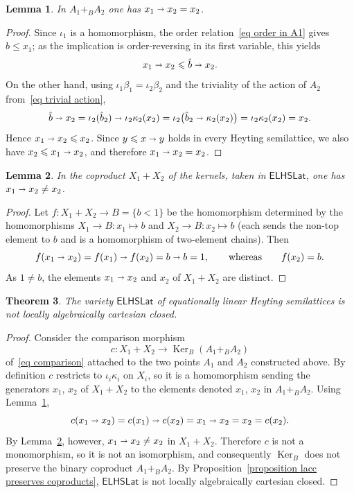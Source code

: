 \documentclass[reqno,a4paper]{amsart}
\newtheorem{lemma}{Lemma}[section]
\newtheorem{theorem}[lemma]{Theorem}
\theoremstyle{remark}
\theoremstyle{definition}
\newcommand{\iimplies}{\shortrightarrow}
\DeclareMathOperator{\Ker}{Ker}
\newcommand{\ELHSLat}{\ensuremath{\mathsf{ELHSLat}}}
\renewcommand{\leq}{\leqslant}
\begin{document}
\begin{lemma}\label{lemma lacc collapse}
	In \(A_1 +_B A_2\) one has \(x_1 \iimplies x_2 = x_2\).
\end{lemma}
\begin{proof}
	Since \(\iota_1\) is a homomorphism, the order relation~\eqref{eq order in A1} gives \(\hat b \leq x_1\); as the implication is order-reversing in its first variable, this yields
	\[
		x_1 \iimplies x_2 \leq \hat b \iimplies x_2.
	\]
	On the other hand, using \(\iota_1\beta_1 = \iota_2\beta_2\) and the triviality of the action of \(A_2\) from~\eqref{eq trivial action},
	\[
		\hat b \iimplies x_2 = \iota_2(\hat b_2) \iimplies \iota_2\kappa_2(x_2) = \iota_2\bigl(\hat b_2 \iimplies \kappa_2(x_2)\bigr) = \iota_2\kappa_2(x_2) = x_2.
	\]
	Hence \(x_1 \iimplies x_2 \leq x_2\). Since \(y \leq x \iimplies y\) holds in every Heyting semilattice, we also have \(x_2 \leq x_1 \iimplies x_2\), and therefore \(x_1 \iimplies x_2 = x_2\).
\end{proof}

\begin{lemma}\label{lemma lacc free}
	In the coproduct \(X_1 + X_2\) of the kernels, taken in \(\ELHSLat\), one has \(x_1 \iimplies x_2 \neq x_2\).
\end{lemma}
\begin{proof}
	Let \(f \colon X_1 + X_2 \to B = \{b < 1\}\) be the homomorphism determined by the homomorphisms \(X_1 \to B\colon x_1 \mapsto b\) and \(X_2 \to B\colon x_2 \mapsto b\) (each sends the non-top element to \(b\) and is a homomorphism of two-element chains). Then
	\[
		f(x_1 \iimplies x_2) = f(x_1) \iimplies f(x_2) = b \iimplies b = 1, \qquad \text{whereas} \qquad f(x_2) = b.
	\]
	As \(1 \neq b\), the elements \(x_1 \iimplies x_2\) and \(x_2\) of \(X_1 + X_2\) are distinct.
\end{proof}

\begin{theorem}\label{theorem not lacc}
	The variety \(\ELHSLat\) of equationally linear Heyting semilattices is not locally algebraically cartesian closed.
\end{theorem}
\begin{proof}
	Consider the comparison morphism
	\[
		c \colon X_1 + X_2 \longrightarrow \Ker_B(A_1 +_B A_2)
	\]
	of~\eqref{eq comparison} attached to the two points \(A_1\) and \(A_2\) constructed above. By definition \(c\) restricts to \(\iota_i\kappa_i\) on \(X_i\), so it is a homomorphism sending the generators \(x_1\), \(x_2\) of \(X_1 + X_2\) to the elements denoted \(x_1\), \(x_2\) in \(A_1 +_B A_2\). Using Lemma~\ref{lemma lacc collapse},
	\[
		c(x_1 \iimplies x_2) = c(x_1) \iimplies c(x_2) = x_1 \iimplies x_2 = x_2 = c(x_2).
	\]
	By Lemma~\ref{lemma lacc free}, however, \(x_1 \iimplies x_2 \neq x_2\) in \(X_1 + X_2\). Therefore \(c\) is not a monomorphism, so it is not an isomorphism, and consequently \(\Ker_B\) does not preserve the binary coproduct \(A_1 +_B A_2\). By Proposition~\ref{proposition lacc preserves coproducts}, \(\ELHSLat\) is not locally algebraically cartesian closed.
\end{proof}
\end{document}
